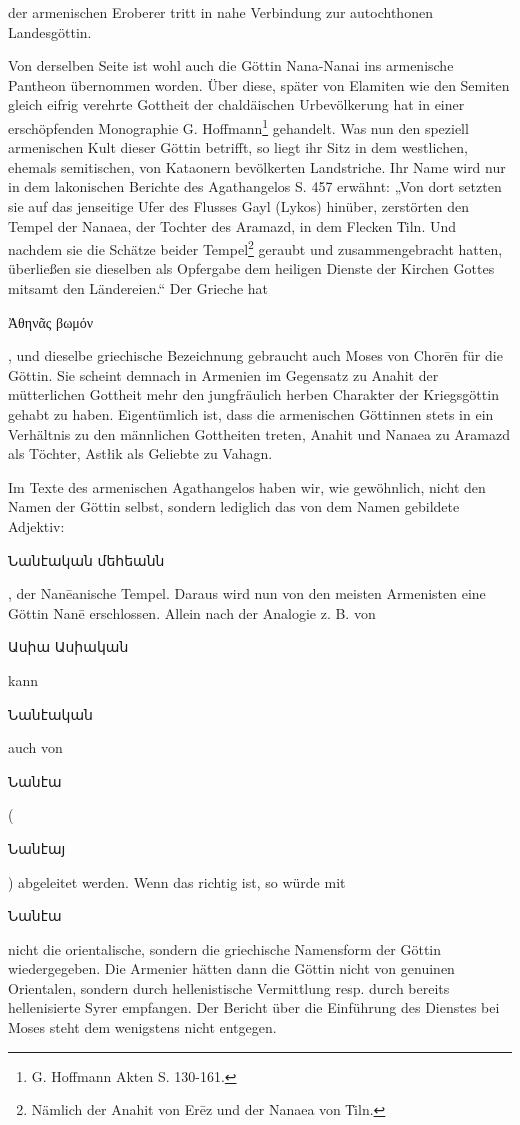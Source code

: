 \documentclass{article}
\begin{document}
der armenischen Eroberer tritt in nahe Verbindung zur autochthonen Landesgöttin.

Von derselben Seite ist wohl auch die Göttin Nana-Nanai ins armenische Pantheon übernommen worden. Über diese, später von Elamiten wie den Semiten gleich eifrig verehrte Gottheit der chaldäischen Urbevölkerung hat in einer erschöpfenden Monographie G. Hoffmann\footnote{G. Hoffmann Akten S. 130-161.} gehandelt. Was nun den speziell armenischen Kult dieser Göttin betrifft, so liegt ihr Sitz in dem westlichen, ehemals semitischen, von Kataonern bevölkerten Landstriche. Ihr Name wird nur in dem lakonischen Berichte des Agathangelos S. 457 erwähnt: „Von dort setzten sie auf das jenseitige Ufer des Flusses Gayl (Lykos) hinüber, zerstörten den Tempel der Nanaea, der Tochter des Aramazd, in dem Flecken T͑iln. Und nachdem sie die Schätze beider Tempel\footnote{Nämlich der Anahit von Erēz und der Nanaea von T͑iln.} geraubt und zusammengebracht hatten, überließen sie dieselben als Opfergabe dem heiligen Dienste der Kirchen Gottes mitsamt den Ländereien.“ Der Grieche hat \begin{greek}Ἀθηνᾶς βωμόν\end{greek}, und dieselbe griechische Bezeichnung gebraucht auch Moses von Chorēn für die Göttin. Sie scheint demnach in Armenien im Gegensatz zu Anahit der mütterlichen Gottheit mehr den jungfräulich herben Charakter der Kriegsgöttin gehabt zu haben. Eigentümlich ist, dass die armenischen Göttinnen stets in ein Verhältnis zu den männlichen Gottheiten treten, Anahit und Nanaea zu Aramazd als Töchter, Astłik als Geliebte zu Vahagn.

Im Texte des armenischen Agathangelos haben wir, wie gewöhnlich, nicht den Namen der Göttin selbst, sondern lediglich das von dem Namen gebildete Adjektiv: \begin{armenian}Նանէական մեհեանն\end{armenian}, der Nanēanische Tempel. Daraus wird nun von den meisten Armenisten eine Göttin Nanē erschlossen. Allein nach der Analogie z. B. von \begin{armenian}Ասիա Ասիական\end{armenian} kann \begin{armenian}Նանէական\end{armenian} auch von \begin{armenian}Նանէա\end{armenian} (\begin{armenian}Նանէայ\end{armenian}) abgeleitet werden. Wenn das richtig ist, so würde mit \begin{armenian}Նանէա\end{armenian} nicht die orientalische, sondern die griechische Namensform der Göttin wiedergegeben. Die Armenier hätten dann die Göttin nicht von genuinen Orientalen, sondern durch hellenistische Vermittlung resp. durch bereits hellenisierte Syrer empfangen. Der Bericht über die Einführung des Dienstes bei Moses steht dem wenigstens nicht entgegen.
\end{document}
